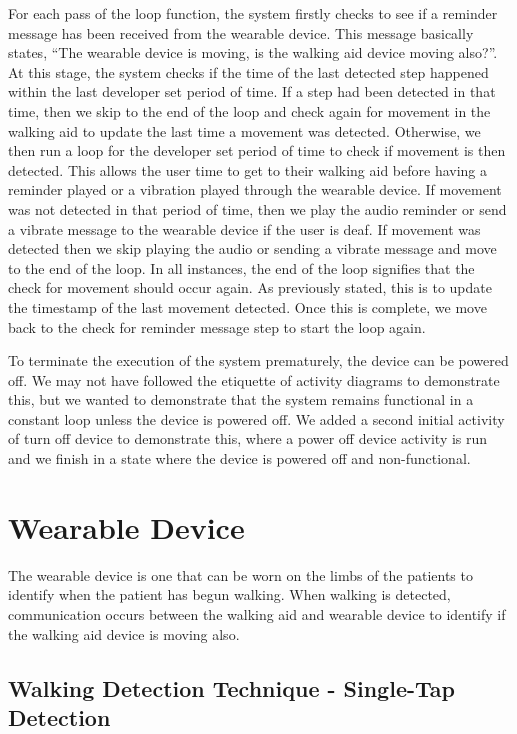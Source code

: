                 For each pass of the loop function, the system firstly checks to see if a reminder message has been received from the wearable device. This message basically states, ``The wearable device is moving, is the walking aid device moving also?''. At this stage, the system checks if the time of the last detected step happened within the last developer set period of time. If a step had been detected in that time, then we skip to the end of the loop and check again for movement in the walking aid to update the last time a movement was detected. Otherwise, we then run a loop for the developer set period of time to check if movement is then detected. This allows the user time to get to their walking aid before having a reminder played or a vibration played through the wearable device. If movement was not detected in that period of time, then we play the audio reminder or send a vibrate message to the wearable device if the user is deaf. If movement was detected then we skip playing the audio or sending a vibrate message and move to the end of the loop. In all instances, the end of the loop signifies that the check for movement should occur again. As previously stated, this is to update the timestamp of the last movement detected. Once this is complete, we move back to the check for reminder message step to start the loop again.

                To terminate the execution of the system prematurely, the device can be powered off. We may not have followed the etiquette of activity diagrams to demonstrate this, but we wanted to demonstrate that the system remains functional in a constant loop unless the device is powered off. We added a second initial activity of turn off device to demonstrate this, where a power off device activity is run and we finish in a state where the device is powered off and non-functional.
            
    \section{Wearable Device}
    \label{sec:wearabledevice}

        The wearable device is one that can be worn on the limbs of the patients to identify when the patient has begun walking. When walking is detected, communication occurs between the walking aid and wearable device to identify if the walking aid device is moving also. 

        \subsection{Walking Detection Technique - Single-Tap Detection}
        \label{subsec:walking_detection_technique}

